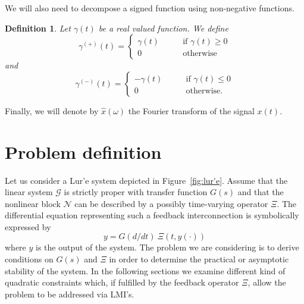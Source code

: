 \documentclass[letterpaper,10pt,conference,twocolumn]{IEEEtran}
\newtheorem{dfn}{Definition}
\newcommand{\w}{\omega}
\newcommand{\Csi}{\Xi}
\begin{document}
We will also need to decompose a signed function using non-negative functions.
\begin{dfn}
	Let $\gamma(t)$ be a real valued function. We define
	\begin{equation}\nonumber
		\gamma^{(+)}(t)=
			\left\{\begin{array}{ll}
				\gamma(t)\qquad &\text{if } \gamma(t)\geq 0\\
				0 & \text{otherwise}
			\end{array}\right.
	\end{equation}
	and
	\begin{equation}\nonumber
		\gamma^{(-)}(t)=
			\left\{\begin{array}{ll}
				-\gamma(t)\qquad &\text{if } \gamma(t)\leq 0\\
				0 & \text{otherwise}.
			\end{array}\right.
	\end{equation}
\end{dfn}

Finally, we will denote by $\hat x(\w)$ the Fourier transform of the signal $x(t)$.

\section{Problem definition}\label{sec:problemdefinition}
Let us consider a Lur'e system depicted in Figure~\ref{fig:lur'e}.
Assume that the linear system $\mathcal{G}$ is strictly proper with transfer function $G(s)$ and that the nonlinear block $\mathcal{N}$ can be described by a possibly time-varying operator $\Csi$. 
The differential equation representing such a feedback interconnection is symbolically expressed by
\begin{equation}\label{eq:symlur'e}
	y = G(d/dt)~\Csi(t, y(\cdot))
\end{equation}
where $y$ is the output of the system.
The problem we are considering is to derive conditions on $G(s)$ and $\Csi$ in order to determine the practical or asymptotic stability of the system. In the following sections we examine different kind of quadratic constraints which, if fulfilled by the feedback operator $\Csi$, allow the problem to be addressed via LMI's.
\end{document}
